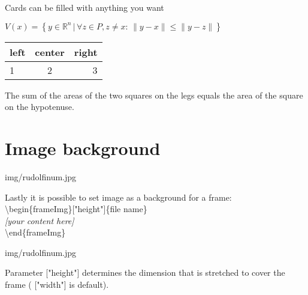 \documentclass[aspectratio=43]{beamer}
\begin{document}
\begin{frame}{Cards can be filled with anything you want}

\begin{card}
\centering$V(x) = \left\{ y \in \mathbb{R}^n \,|\, \forall z \in P, z\neq x:\, \|y-x\|\leq\|y-z\| \right\}$
\end{card}

\begin{card}
\centering
\begin{tabular}{lcr}
left & center & right \\
\hline
1 & 2 & 3 \\
\end{tabular}
\end{card}

\begin{card}
\begin{theorem}[Pythagorean]
The sum of the areas of the two squares on the legs equals the area of the square on the hypotenuse.
\end{theorem}
\end{card}
\end{frame}


\section{Image background}
\begin{frameImg}{img/rudolfinum.jpg}
\vspace*{55mm}
\begin{cardTiny}
Lastly it is possible to set image as a background for a frame:\\[2mm]
{\color{primary} \textbackslash begin\{frameImg\}["height"]\{file name\}\\[2mm]}
\null\qquad \textit{[your content here]}\\[2mm]
{\color{primary} \textbackslash end\{frameImg\}}
\end{cardTiny}
\end{frameImg}


\begin{frameImg}[height]{img/rudolfinum.jpg}
\vspace*{60mm}
\begin{cardTiny}
Parameter {\color{primary} ["height"]} determines the dimension that is stretched to cover the frame ({\color{primary} ["width"]} is default).
\end{cardTiny}
\end{frameImg}
\end{document}
